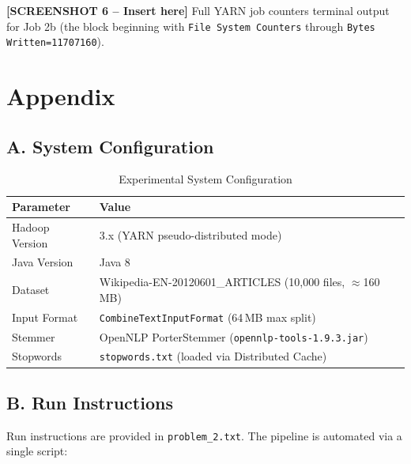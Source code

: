 \documentclass[12pt,a4paper]{article}
\begin{document}
\begin{mdframed}[backgroundcolor=yellow!15, linecolor=orange, linewidth=1pt]
\textbf{[SCREENSHOT 6 -- Insert here]}
Full YARN job counters terminal output for Job 2b (the block beginning with
\texttt{File System Counters} through \texttt{Bytes Written=11707160}).
\end{mdframed}

\newpage
\appendix
\section*{Appendix}

\subsection*{A. System Configuration}

\begin{table}[h]
\centering
\caption{Experimental System Configuration}
\begin{tabular}{@{}ll@{}}
\toprule
\textbf{Parameter} & \textbf{Value} \\
\midrule
Hadoop Version   & 3.x (YARN pseudo-distributed mode) \\
Java Version     & Java 8 \\
Dataset          & Wikipedia-EN-20120601\_ARTICLES (10,000 files, $\approx$160\,MB) \\
Input Format     & \texttt{CombineTextInputFormat} (64\,MB max split) \\
Stemmer          & OpenNLP PorterStemmer (\texttt{opennlp-tools-1.9.3.jar}) \\
Stopwords        & \texttt{stopwords.txt} (loaded via Distributed Cache) \\
\bottomrule
\end{tabular}
\end{table}

\subsection*{B. Run Instructions}

Run instructions are provided in \texttt{problem\_2.txt}.
The pipeline is automated via a single script:
\end{document}
